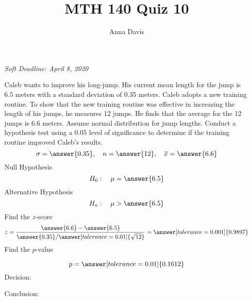 \documentclass{ximera}
\author{Anna Davis} \title{MTH 140 Quiz 10}
\begin{document}
\begin{abstract}

\end{abstract}
\maketitle
 \textit{Soft Deadline: April 8, 2020}
\begin{problem}\label{prob:140quiz10prob1}
Caleb wants to improve his long-jump.  His current mean length for the jump is 6.5 meters with a standard deviation of 0.35 meters.  Caleb adopts a new training routine.  To show that the new training routine was effective in increasing the length of his jumps, he measures 12 jumps. He finds that the average for the 12 jumps is 6.6 meters.  Assume normal distribution for jump lengths.  Conduct a hypothesis test using a 0.05 level of significance to determine if the training routine improved Caleb's results.
$$\sigma=\answer{0.35},\quad n=\answer{12},\quad \overline{x}=\answer{6.6}$$
Null Hypothesis
$$H_0:\quad \mu=\answer{6.5}$$
Alternative Hypothesis
$$H_a:\quad \mu>\answer{6.5}$$
Find the $z$-score
$$z=\frac{\answer{6.6}-\answer{6.5}}{\answer{0.35}/\answer[tolerance=0.01]{\sqrt{12}}}=\answer[tolerance=0.001]{0.9897}$$
Find the $p$-value
\begin{center}  
\end{center}
$$p=\answer[tolerance=0.01]{0.1612}$$
Decision:

\begin{multipleChoice} 
\end{multipleChoice}  

Conclusion:

\begin{multipleChoice} 
\end{multipleChoice} 
\end{problem}
\end{document}
